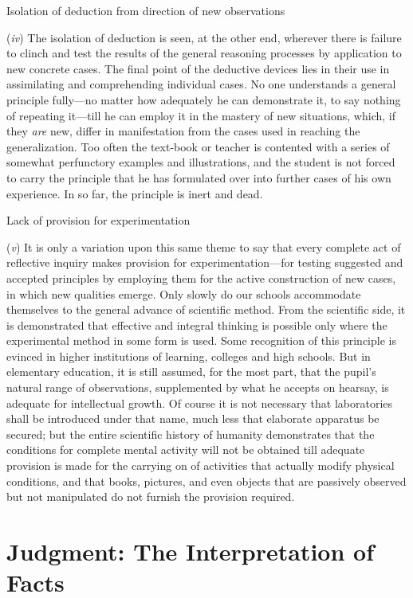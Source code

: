 \documentclass[letterpaper]{book}
\begin{document}
Isolation of deduction from direction of new observations

(\emph{iv}) The isolation of deduction is seen, at the other end,
wherever there is failure to clinch and test the results of the general
reasoning processes by application to new concrete cases. The final
point of the deductive devices lies in their use in assimilating and
comprehending individual cases. No one understands a general principle
fully---no matter how adequately he can demonstrate it, to say nothing
of repeating it---till he can employ it in the mastery of new
situations, which, if they \emph{are} new, differ in manifestation from
the cases used in reaching the generalization. Too often the text-book
or teacher is contented with a series of somewhat perfunctory examples
and illustrations, and the student is not forced to carry the principle
that he has formulated over into further cases of his own experience. In
so far, the principle is inert and dead.

Lack of provision for experimentation

(\emph{v}) It is only a variation upon this same theme to say that every
complete act of reflective inquiry makes provision for
experimentation---for testing suggested and accepted principles by
employing them for the active construction of new cases, in which new
qualities emerge. Only slowly do our schools accommodate themselves to
the general advance of scientific method. From the scientific side, it
is demonstrated that effective and integral thinking is possible only
where the
experimental
method in some form is used. Some recognition of this principle is
evinced in higher institutions of learning, colleges and high schools.
But in elementary education, it is still assumed, for the most part,
that the pupil's natural range of observations, supplemented by what he
accepts on hearsay, is adequate for intellectual growth. Of course it is
not necessary that laboratories shall be introduced under that name,
much less that elaborate apparatus be secured; but the entire scientific
history of humanity demonstrates that the conditions for complete mental
activity will not be obtained till adequate provision is made for the
carrying on of activities that actually modify physical conditions, and
that books, pictures, and even objects that are passively observed but
not manipulated do not furnish the provision
required.

\chapter{Judgment: The Interpretation of Facts}
\end{document}
